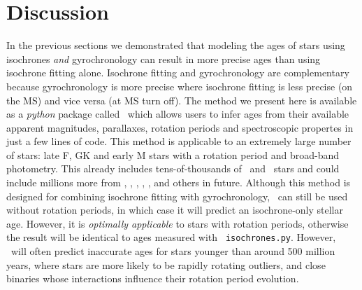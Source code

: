 \section{Discussion}
\label{section:discussion}

In the previous sections we demonstrated that modeling the ages of stars using
isochrones {\it and} gyrochronology can result in more precise ages than using
isochrone fitting alone.
Isochrone fitting and gyrochronology are  complementary because gyrochronology
is more precise where isochrone fitting is less precise (on the MS) and vice
versa (at MS turn off).
The method we present here is available as a {\it python} package called \sd\
which allows users to infer ages from their available apparent magnitudes,
parallaxes, rotation periods and spectroscopic propertes in just a few lines
of code.
This method is applicable to an extremely large number of stars: late F, GK
and early M stars with a rotation period and broad-band photometry.
This already includes tens-of-thousands of \kepler\ and \ktwo\ stars and could
include millions more from \tess, \lsst, \wfirst, \plato, \gaia, and others in
future.
Although this method is designed for combining isochrone fitting with
gyrochronology, \sd\ can still be used without rotation periods, in
which case it will predict an isochrone-only stellar age.
However, it is {\it optimally applicable} to stars with rotation periods,
otherwise the result will be identical to ages measured with {\tt
isochrones.py}.
However, \sd\ will often predict inaccurate ages for stars younger than around
500 million years, where stars are more likely to be rapidly rotating
outliers, and close binaries whose interactions influence their rotation
period evolution.
